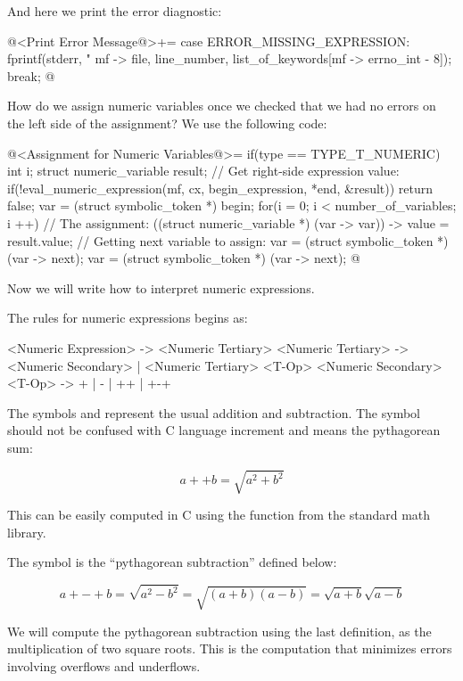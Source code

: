 And here we print the error diagnostic:

\iniciocodigo
@<Print Error Message@>+=
case ERROR_MISSING_EXPRESSION:
  fprintf(stderr, "%
          mf -> file, line_number, list_of_keywords[mf -> errno_int - 8]);
  break;
@
\fimcodigo


How do we assign numeric variables once we checked that we had no
errors on the left side of the assignment? We use the following code:

\iniciocodigo
@<Assignment for Numeric Variables@>=
if(type == TYPE_T_NUMERIC){
  int i;
  struct numeric_variable result;
  // Get right-side expression value:
  if(!eval_numeric_expression(mf, cx, begin_expression, *end, &result))
    return false;
  var = (struct symbolic_token *) begin;
  for(i = 0; i < number_of_variables; i ++){
    // The assignment:
    ((struct numeric_variable *) (var -> var)) -> value = result.value;
    // Getting next variable to assign:
    var = (struct symbolic_token *) (var -> next);
    var = (struct symbolic_token *) (var -> next);
  }
}
@
\fimcodigo

Now we will write how to interpret numeric expressions.


The rules for numeric expressions begins as:

\alinhaverbatim
<Numeric Expression> -> <Numeric Tertiary>
<Numeric Tertiary> -> <Numeric Secondary> |
                      <Numeric Tertiary> <T-Op> <Numeric Secondary>
<T-Op> -> + | - | ++ | +-+
\alinhanormal

The symbols \monoespaco{+} and \monoespaco{-} represent the usual
addition and subtraction. The symbol \monoespaco{++} should not be
confused with C language increment and means the pythagorean sum:

$$
a ++ b = \sqrt{a^2 + b^2}
$$

This can be easily computed in C using the
function  from the standard math library.

The symbol \monoespaco{+-+} is the ``pythagorean subtraction'' defined
below:

$$
a +-+ b = \sqrt{a^2 - b^2} = \sqrt{(a+b)(a-b)} = \sqrt{a+b}\sqrt{a-b}
$$

We will compute the pythagorean subtraction using the last definition,
as the multiplication of two square roots. This is the computation
that minimizes errors involving overflows and underflows.

